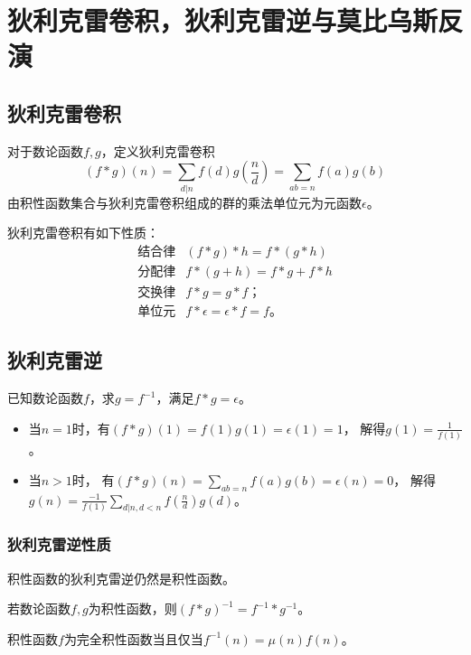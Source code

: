 \section{狄利克雷卷积，狄利克雷逆与莫比乌斯反演}
\subsection{狄利克雷卷积}
对于数论函数$f,g$，定义狄利克雷卷积
\begin{displaymath}
	(f*g)(n)=\sum_{d|n}{f(d)g(\frac{n}{d})}=\sum_{ab=n}{f(a)g(b)}
\end{displaymath}
由积性函数集合与狄利克雷卷积组成的群的乘法单位元为元函数$\epsilon$。

狄利克雷卷积有如下性质：
\begin{eqnarray*}
	\textrm{结合律} & (f*g)*h=f*(g*h)\\
	\textrm{分配律} & f*(g+h)=f*g+f*h\\
	\textrm{交换律} & f*g=g*f；\\
	\textrm{单位元} & f*\epsilon=\epsilon*f=f。
\end{eqnarray*}
\subsection{狄利克雷逆}
已知数论函数$f$，求$g=f^{-1}$，满足$f*g=\epsilon$。
\begin{itemize}
	\item 当$n=1$时，有$(f*g)(1)=f(1)g(1)=\epsilon(1)=1$，
	      解得$g(1)=\frac{1}{f(1)}$。
	\item 当$n>1$时，
	      有$\displaystyle (f*g)(n)=\sum_{ab=n}{f(a)g(b)}=\epsilon(n)=0$，
	      解得$\displaystyle g(n)=\frac{-1}{f(1)}
		      \sum_{d|n,d<n}{f(\frac{n}{d})g(d)}$。
\end{itemize}
\subsubsection{狄利克雷逆性质}
\begin{property}
	积性函数的狄利克雷逆仍然是积性函数。
\end{property}
\begin{property}
	若数论函数$f,g$为积性函数，则$(f*g)^{-1}=f^{-1}*g^{-1}$。
\end{property}
\begin{property}\label{CMFP}
	积性函数$f$为完全积性函数当且仅当$f^{-1}(n)=\mu(n)f(n)$。
\end{property}
